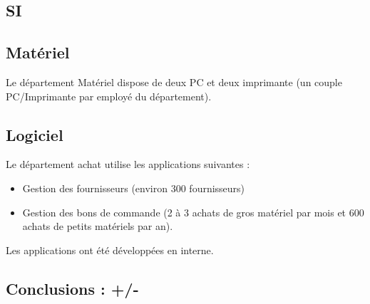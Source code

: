\documentclass[a4paper]{article}
\begin{document}
\subsection{SI}

\subsection{Matériel}
Le département Matériel dispose de deux PC et deux imprimante (un couple
PC/Imprimante par employé du département).

\subsection{Logiciel}
Le département achat utilise les applications suivantes :
\begin{itemize}
\item Gestion des fournisseurs (environ 300 fournisseurs)
\item Gestion des bons de commande (2 à 3 achats de gros matériel par mois
et 600 achats de petits matériels par an).
\end{itemize}

Les applications ont été développées en interne.


\subsection{Conclusions : +/-}
\end{document}
